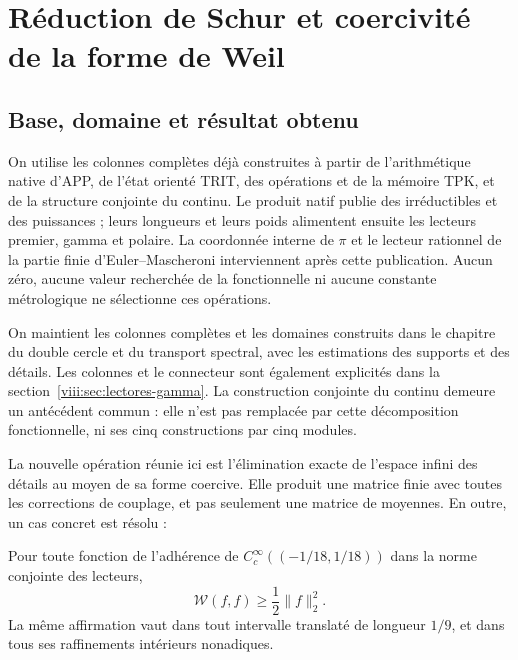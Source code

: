 \clearpage
\section{Réduction de Schur et coercivité de la forme de Weil}
\label{viii:sec:schur-coercividad}


\subsection{Base, domaine et résultat obtenu}
\label{viii:schur-add-sub-6}

On utilise les colonnes complètes déjà construites à partir de l'arithmétique native
d'APP, de l'état orienté TRIT, des opérations et de la mémoire TPK, et de la
structure conjointe du continu. Le produit natif publie des irréductibles et des
puissances ; leurs longueurs et leurs poids alimentent ensuite les lecteurs premier,
gamma et polaire. La coordonnée interne de \(\pi\) et le lecteur rationnel de la partie
finie d'Euler--Mascheroni interviennent après cette publication. Aucun
zéro, aucune valeur recherchée de la fonctionnelle ni aucune constante métrologique ne sélectionne ces
opérations.

On maintient les colonnes complètes et les domaines construits dans le
chapitre du double cercle et du transport spectral, avec les estimations
des supports et des détails. Les colonnes et le connecteur sont également explicités dans
la section~\ref{viii:sec:lectores-gamma}. La construction conjointe
du continu demeure un antécédent commun : elle n'est pas remplacée par cette
décomposition fonctionnelle, ni ses cinq constructions par cinq modules.

La nouvelle opération réunie ici est l'élimination exacte de l'espace infini des détails au moyen de sa forme coercive. Elle produit une matrice finie avec toutes les corrections de couplage, et pas seulement une matrice de moyennes. En outre, un cas concret est résolu :

Pour toute fonction de l'adhérence de
\(C_c^\infty((-1/18,1/18))\) dans la norme conjointe des lecteurs,
\begin{equation}
\mathscr W(f,f)\geq\frac12\|f\|_2^2.
\label{viii:schur-add-display-1}
\end{equation}
La même affirmation vaut dans tout intervalle translaté de longueur \(1/9\), et dans tous ses raffinements intérieurs nonadiques.

